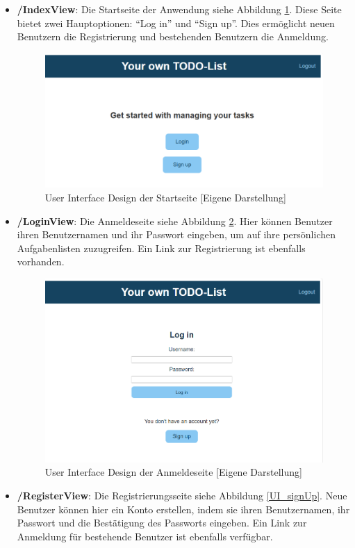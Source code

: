 \begin{itemize}
	\item \textbf{/IndexView}: Die Startseite der Anwendung siehe Abbildung \ref{UI_index}. Diese Seite bietet zwei Hauptoptionen: "`Log in"' und "`Sign up"'. Dies ermöglicht neuen Benutzern die Registrierung und bestehenden Benutzern die Anmeldung.
	
	\begin{figure}[h]
		\centering
		\includegraphics[clip,width=0.75\linewidth]{images/index.png}
		\caption[User Interface Design der Startseite]{User Interface Design der Startseite [Eigene Darstellung]}
		\label{UI_index}
	\end{figure}	
	
	\item \textbf{/LoginView}: Die Anmeldeseite siehe Abbildung \ref{UI_logIn}. Hier können Benutzer ihren Benutzernamen und ihr Passwort eingeben, um auf ihre persönlichen Aufgabenlisten zuzugreifen. Ein Link zur Registrierung ist ebenfalls vorhanden.
	
	\begin{figure}[h]
		\centering
		\includegraphics[clip,width=0.75\linewidth]{images/logIn.png}
		\caption[User Interface Design der Anmeldeseite]{User Interface Design der Anmeldeseite [Eigene Darstellung]}
		\label{UI_logIn}
	\end{figure}	
	
	\item \textbf{/RegisterView}: Die Registrierungsseite siehe Abbildung \ref{UI_signUp}. Neue Benutzer können hier ein Konto erstellen, indem sie ihren Benutzernamen, ihr Passwort und die Bestätigung des Passworts eingeben. Ein Link zur Anmeldung für bestehende Benutzer ist ebenfalls verfügbar.
	

\end{itemize}
